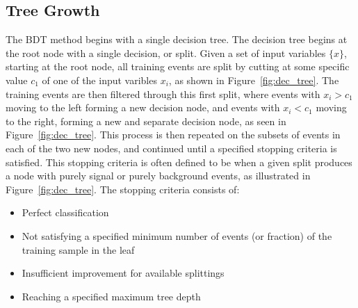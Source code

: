 \subsection{Tree Growth}
The BDT method begins with a single decision tree. The decision tree begins at the root node with a single decision, or split.
Given a set of input variables $\{x\}$, starting at the root node, all training events are split by cutting at some specific value $c_{1}$
of one of the input varibles $x_{i}$, as shown in Figure~\ref{fig:dec_tree}.
The training events are then filtered through this first split, where events
with $x_{i} > c_{1}$ moving to the left forming a new decision node, and events with $x_{i} < c_{1}$ moving to the right, forming a new and separate 
decision node, as seen in Figure~\ref{fig:dec_tree}. This process is then repeated on the subsets of events in each of the two new nodes, and continued until
a specified stopping criteria is satisfied. This stopping criteria is often defined to be when a given split produces a node with purely signal or purely
background events, as illustrated in Figure~\ref{fig:dec_tree}. The stopping criteria consists of:
\begin{itemize}
\item Perfect classification
\item Not satisfying a specified minimum number of events (or fraction) of the training sample in the leaf
\item Insufficient improvement for available splittings
\item Reaching a specified maximum tree depth
\end{itemize}

